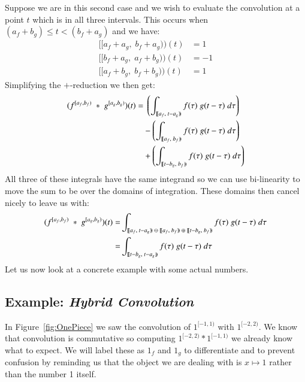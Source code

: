 \pagebreak

Suppose we are in this second case and we wish to evaluate the convolution at a point $t$ which is in all three intervals.
This occurs when $(a_f+b_g) \leq t < (b_f+a_g)$ and we have:
\begin{align*}
	[\![a_f+a_g, \; b_f+a_g)\!)(t) &= 1 \\
	[\![b_f+a_g, \; a_f+b_g)\!)(t) &= -1 \\
	[\![a_f+b_g,\; b_f+b_g)\!)(t) &= 1
\end{align*}
Simplifying the $+$-reduction we then get:
\begin{align}
	(f^{[a_f,b_f)} \;*\; g^{[a_g,b_g)}) (t) = 
		& \; \left( 
			\int_{[\![a_f,\;t-a_g)\!)} f(\tau) \; g(t-\tau) \; d\tau \right) 
				\notag \\ &- \left( 
			\int_{[\![a_f,\;b_f)\!)} f(\tau) \; g(t-\tau) \; d\tau \right)
				\notag \\ &+ \left( 
			\int_{[\![t-b_g,\;b_f)\!)} f(\tau) \; g(t-\tau) \; d\tau \right) 
\end{align}
All three of these integrals have the same integrand so we can use bi-linearity to move the sum to be over the domains
of integration.
These domains then cancel nicely to leave us with:
\begin{align}
	\label{eqn:HybridConvMidFinal}
	(f^{[a_f,b_f)} \;*\; g^{[a_g,b_g)}) (t) = &
		\int_{[\![a_f,\;t-a_g)\!) \;\ominus\; [\![a_f,\;b_f)\!) \;\oplus\; [\![t-b_g,\;b_f)\!)} f(\tau) \; g(t-\tau) \; d\tau \notag\\
		= & \int_{[\![t-b_g,\;t-a_g)\!)} f(\tau) \; g(t-\tau) \; d\tau
\end{align}
Let us now look at a concrete example with some actual numbers.





\subsection{Example: \emph{Hybrid Convolution}}


In Figure~\ref{fig:OnePiece} we saw the convolution of $1^{[-1,1)}$ with $1^{[-2,2)}$.
We know that convolution is commutative so computing $1^{[-2,2)} * 1^{[-1,1)}$ we already know what to expect.
We will label these as $1_f$ and $1_g$ to differentiate and to prevent confusion by reminding us that the object we are 
dealing with is $x \mapsto 1$ rather than the number 1 itself.


